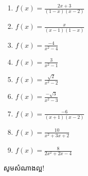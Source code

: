 \documentclass[12pt,a4paper]{article}
\begin{document}
\begin{enumerate}[I]
\begin{multicols}{3}
\begin{enumerate}[1]
				\item $f(x)=\frac{2x+3}{(1-x)(x-2)}$
				\item $f(x)=\frac{x}{(x-1)(1-x)}$
				\item $f(x)=\frac{-4}{x^2-4}$
				\item $f(x)=\frac{3}{x^2-1}$
				\item $f(x)=\frac{\sqrt{2}}{x^2-2}$
				\item $f(x)=\frac{-\sqrt{3}}{x^2-3}$
				\item $f(x)=\frac{-6}{(x+1)(x-2)}$
				\item $f(x)=\frac{10}{x^2+3x+2}$
				\item $f(x)=\frac{8}{2x^2+2x-4}$
			\end{enumerate}
		\end{multicols}
		\end{enumerate}
	\begin{center}
		\sffamily\color{black}
		សូមសំណាងល្អ!
	\end{center}\newpage
\end{document}
